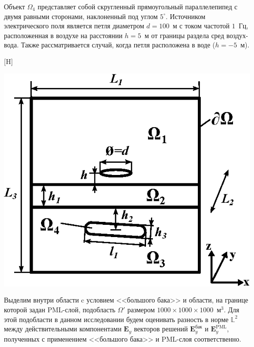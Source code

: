 \documentclass[a4paper,14pt]{article}
\makeatletter
\renewenvironment{figure}[1][\fps@figure]{
  \edef\@tempa{\noexpand\@float{figure}[#1]}
  \@tempa
  \addtocounter{foofigure}{1}
}{
  \end@float
}
\makeatother
\begin{document}
Объект $\Omega_4$ представляет собой скругленный прямоугольный параллелепипед с двумя равными сторонами, наклоненный под углом $5^{\circ}$. Источником электрического поля является петля диаметром $d = 100$~м с током частотой $1$~Гц, расположенная в воздухе на расстоянии $h = 5$~м от границы раздела сред воздух-вода. Также рассматривается случай, когда петля расположена в воде ($h = -5$~м).

\begin{figure}[H]
	\centering
	\includegraphics[scale=1.5]{research-2/area_3layers/area_3layers_3.eps}
	\caption{расчетная область}
	\label{fig:res2:area}
\end{figure}

Выделим внутри области c условием <<большого бака>> и области, на границе которой задан PML-слой, подобласть $\Omega'$ размером $1000 \times 1000 \times 1000$~м${}^3$. Для этой подобласти в данном исследовании будем оценивать разность в норме $\mathbb{L}^2$ между действительными компонентами $\mathbf{E}_y$ векторов решений $\mathbf{E}_y^{\text{бак}}$ и $\mathbf{E}_y^{\text{PML}}$, полученных с применением <<большого бака>> и PML-слоя соответственно.
\end{document}

